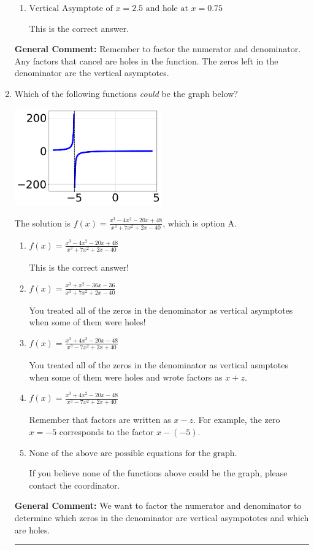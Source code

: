 \documentclass{extbook}[14pt]
\newcommand{\litem}[1]{\item #1

\rule{\textwidth}{0.4pt}}
\begin{document}
\begin{enumerate}
{\begin{enumerate}[label=\Alph*.]
This corresponds to not factoring out the hole.
\item \( \text{Vertical Asymptote of } x = 2.5 \text{ and hole at } x = 0.75 \)

This is the correct answer.
\end{enumerate}

\textbf{General Comment:} Remember to factor the numerator and denominator. Any factors that cancel are holes in the function. The zeros left in the denominator are the vertical asymptotes.
}
\litem{
Which of the following functions \textit{could} be the graph below?

\begin{center}
    \includegraphics[width=0.5\textwidth]{../Figures/identifyGraphOfRationalFunctionCopyC.png}
\end{center}




The solution is \( f(x)=\frac{x^{3} -4 x^{2} -20 x + 48}{x^{3} +7 x^{2} +2 x -40} \), which is option A.\begin{enumerate}[label=\Alph*.]
\item \( f(x)=\frac{x^{3} -4 x^{2} -20 x + 48}{x^{3} +7 x^{2} +2 x -40} \)

This is the correct answer!
\item \( f(x)=\frac{x^{3} + x^{2} -36 x -36}{x^{3} +7 x^{2} +2 x -40} \)

You treated all of the zeros in the denominator as vertical asymptotes when some of them were holes!
\item \( f(x)=\frac{x^{3} +4 x^{2} -20 x -48}{x^{3} -7 x^{2} +2 x + 40} \)

You treated all of the zeros in the denominator as vertical asmptotes when some of them were holes and wrote factors as $x+z$.
\item \( f(x)=\frac{x^{3} +4 x^{2} -20 x -48}{x^{3} -7 x^{2} +2 x + 40} \)

Remember that factors are written as $x-z$. For example, the zero $x=-5$ corresponds to the factor $x-(-5)$.
\item \( \text{None of the above are possible equations for the graph.} \)

If you believe none of the functions above could be the graph, please contact the coordinator.
\end{enumerate}

\textbf{General Comment:} We want to factor the numerator and denominator to determine which zeros in the denominator are vertical asympototes and which are holes.
}
\end{enumerate}
\end{document}

